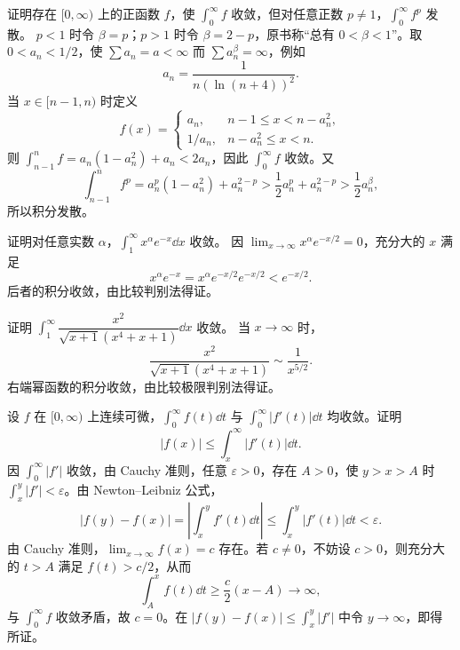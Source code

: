 证明存在 $[0,\infty)$ 上的正函数 $f$，使 $\int_0^\infty f$ 收敛，但对任意正数 $p\ne1$，$\int_0^\infty f^p$ 发散。
\prooftext $p<1$ 时令 $\beta=p$；$p>1$ 时令 $\beta=2-p$，原书称“总有 $0<\beta<1$”。取 $0<a_n<1/2$，使 $\sum a_n=a<\infty$ 而 $\sum a_n^\beta=\infty$，例如
\[
a_n=\frac1{n(\ln(n+4))^2}.
\]
当 $x\in[n-1,n)$ 时定义
\[
f(x)=\begin{cases}
a_n,&n-1\le x<n-a_n^2,\\
1/a_n,&n-a_n^2\le x<n.
\end{cases}
\]
则 $\int_{n-1}^nf=a_n(1-a_n^2)+a_n<2a_n$，因此 $\int_0^\infty f$ 收敛。又
\[
\int_{n-1}^nf^p=a_n^p(1-a_n^2)+a_n^{2-p}
>\frac12a_n^p+a_n^{2-p}>\frac12a_n^\beta,
\]
所以积分发散。

证明对任意实数 $\alpha$，$\int_1^\infty x^\alpha e^{-x}\dd x$ 收敛。
\prooftext 因 $\lim_{x\to\infty}x^\alpha e^{-x/2}=0$，充分大的 $x$ 满足
\[
x^\alpha e^{-x}=x^\alpha e^{-x/2}e^{-x/2}<e^{-x/2}.
\]
后者的积分收敛，由比较判别法得证。

证明 $\int_1^\infty\dfrac{x^2}{\sqrt{x+1}(x^4+x+1)}\dd x$ 收敛。
\prooftext 当 $x\to\infty$ 时，
\[
\frac{x^2}{\sqrt{x+1}(x^4+x+1)}\sim\frac1{x^{5/2}}.
\]
右端幂函数的积分收敛，由比较极限判别法得证。

设 $f$ 在 $[0,\infty)$ 上连续可微，$\int_0^\infty f(t)\dd t$ 与 $\int_0^\infty|f'(t)|\dd t$ 均收敛。证明
\[
|f(x)|\le\int_x^\infty|f'(t)|\dd t.
\]
\prooftext 因 $\int_0^\infty|f'|$ 收敛，由 Cauchy 准则，任意 $\varepsilon>0$，存在 $A>0$，使 $y>x>A$ 时 $\int_x^y|f'|<\varepsilon$。由 Newton--Leibniz 公式，
\[
|f(y)-f(x)|=\left|\int_x^yf'(t)\dd t\right|\le\int_x^y|f'(t)|\dd t<\varepsilon.
\]
由 Cauchy 准则，$\lim_{x\to\infty}f(x)=c$ 存在。若 $c\ne0$，不妨设 $c>0$，则充分大的 $t>A$ 满足 $f(t)>c/2$，从而
\[
\int_A^xf(t)\dd t\ge\frac c2(x-A)\to\infty,
\]
与 $\int_0^\infty f$ 收敛矛盾，故 $c=0$。在 $|f(y)-f(x)|\le\int_x^y|f'|$ 中令 $y\to\infty$，即得所证。


